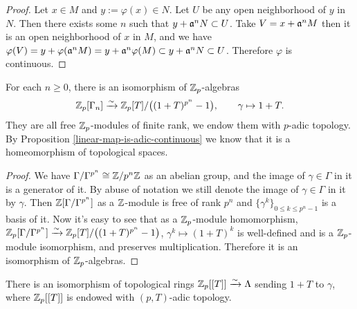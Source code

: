 \begin{proof}
Let $x\in M$ and $y:=\varphi(x)\in N$.
Let $U$ be any open neighborhood of $y$ in $N$.
Then there exists some $n$ such that $y+{\mathfrak{a}}^nN\subset U$.
Take $V=x+{\mathfrak{a}}^nM$ then it is an open neighborhood of $x$ in $M$,
and we have $\varphi(V)=y+\varphi({\mathfrak{a}}^nM)=y+{\mathfrak{a}}^n\varphi(M)\subset y+{\mathfrak{a}}^nN\subset U$.
Therefore $\varphi$ is continuous.
\end{proof}

\begin{prop}
\label{Iwasawa-alg-isom-finite-level}
For each $n\geq 0$, there is an isomorphism of ${\mathbb {Z}}_p$-algebras
$$
{\mathbb {Z}}_p[\Gamma_n]\xrightarrow\sim{\mathbb {Z}}_p[T]/\big((1+T)^{p^n}-1\big),\qquad
\gamma\mapsto 1+T.
$$
They are all free ${\mathbb {Z}}_p$-modules of finite rank,
we endow them with $p$-adic topology.
By Proposition \ref{linear-map-is-adic-continuous}
we know that it is a homeomorphism of topological spaces.
\end{prop}

\begin{proof}
We have $\Gamma/\Gamma^{p^n}\cong{\mathbb {Z}}/p^n{\mathbb {Z}}$ as an abelian group,
and the image of $\gamma\in\Gamma$
in it is a generator of it. By abuse of notation we still denote the image of
$\gamma\in\Gamma$ in it by $\gamma$.
Then ${\mathbb {Z}}[\Gamma/\Gamma^{p^n}]$ as a ${\mathbb {Z}}$-module is free of rank $p^n$
and $\{\gamma^k\}_{0\leq k\leq p^n-1}$ is a basis of it.
Now it's easy to see that as a ${\mathbb {Z}}_p$-module homomorphism,
${\mathbb {Z}}_p[\Gamma/\Gamma^{p^n}]\xrightarrow\sim{\mathbb {Z}}_p[T]/\big((1+T)^{p^n}-1\big)$,
$\gamma^k\mapsto(1+T)^k$ is well-defined and is a ${\mathbb {Z}}_p$-module isomorphism,
and preserves multiplication.
Therefore it is an isomorphism of ${\mathbb {Z}}_p$-algebras.
\end{proof}

\begin{prop}
\label{Iwasawa-alg-isom}
There is an isomorphism of topological rings
${\mathbb {Z}}_p[[T]]\xrightarrow\sim\Lambda$
sending $1+T$ to $\gamma$,
where ${\mathbb {Z}}_p[[T]]$ is endowed with $(p,T)$-adic topology.
\end{prop}


